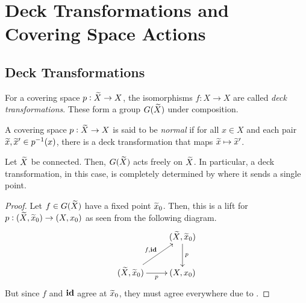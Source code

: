 \section{Deck Transformations and Covering Space Actions}

\subsection{Deck Transformations}
\begin{definition}
    For a covering space $p:\widetilde{X}\to X$, the isomorphisms $f: X\to X$ are called \textit{deck transformations}. These form a group $G(\widetilde{X})$ under composition. 

    A covering space $p:\widetilde{X}\to X$ is said to be \textit{normal} if for all $x\in X$ and each pair $\widetilde{x},\widetilde{x}'\in p^{-1}(x)$, there is a deck transformation that maps $\widetilde{x}\mapsto\widetilde{x}'$.
\end{definition}

\begin{proposition}
    Let $\widetilde{X}$ be connected. Then, $G(\widetilde{X})$ acts freely on $\widetilde{X}$. In particular, a deck transformation, in this case, is completely determined by where it sends a single point.
\end{proposition}
\begin{proof}
    Let $f\in G(\widetilde{X})$ have a fixed point $\widetilde{x}_0$. Then, this is a lift for $p:(\widetilde{X}, \widetilde{x}_0)\to(X,x_0)$ as seen from the following diagram. 
    \begin{equation*}
        \xymatrix {
            & (\wt X, \wt x_0)\ar[d]^p\\
            (\wt X,\wt x_0)\ar[r]_p\ar[ru]^{f,\id} & (X,x_0)
        }
    \end{equation*}
    But since $f$ and $\mathbf{id}$ agree at $\widetilde{x}_0$, they must agree everywhere due to .
\end{proof}

